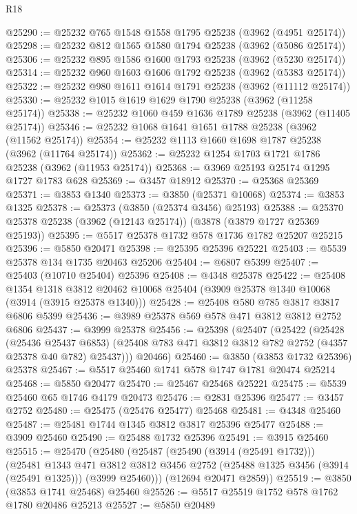 \begin{lexlean}{R18}
\begin{coremodule}
@25290 := @25232 @765 @1548 @1558 @1795 @25238 (@3962 (@4951 @25174))
@25298 := @25232 @812 @1565 @1580 @1794 @25238 (@3962 (@5086 @25174))
@25306 := @25232 @895 @1586 @1600 @1793 @25238 (@3962 (@5230 @25174))
@25314 := @25232 @960 @1603 @1606 @1792 @25238 (@3962 (@5383 @25174))
@25322 := @25232 @980 @1611 @1614 @1791 @25238 (@3962 (@11112 @25174))
@25330 := @25232 @1015 @1619 @1629 @1790 @25238 (@3962 (@11258 @25174))
@25338 := @25232 @1060 @459 @1636 @1789 @25238 (@3962 (@11405 @25174))
@25346 := @25232 @1068 @1641 @1651 @1788 @25238 (@3962 (@11562 @25174))
@25354 := @25232 @1113 @1660 @1698 @1787 @25238 (@3962 (@11764 @25174))
@25362 := @25232 @1254 @1703 @1721 @1786 @25238 (@3962 (@11953 @25174))
@25368 := @3969 @25193 @25174 @1295 @1727 @1783 @628
@25369 := @3457 @18912
@25370 := @25368 @25369
@25371 := @3853 @1340
@25373 := @3850 (@25371 @10068)
@25374 := @3853 @1325
@25378 := @25373 (@3850 (@25374 @3456) @25193)
@25388 := @25370 @25378 @25238 (@3962 (@12143 @25174)) (@3878 (@3879 @1727 @25369 @25193))
@25395 := @5517 @25378 @1732 @578 @1736 @1782 @25207 @25215
@25396 := @5850 @20471
@25398 := @25395 @25396 @25221
@25403 := @5539 @25378 @134 @1735 @20463 @25206
@25404 := @6807 @5399
@25407 := @25403 (@10710 @25404) @25396
@25408 := @4348 @25378
@25422 := @25408
    @1354
    @1318
    @3812
    @20462
    @10068
    @25404
    (@3909 @25378 @1340 @10068 (@3914 (@3915 @25378 @1340)))
@25428 := @25408 @580 @785 @3817 @3817 @6806 @5399
@25436 := @3989 @25378 @569 @578 @471 @3812 @3812 @2752 @6806
@25437 := @3999 @25378
@25456 := @25398
    (@25407
      (@25422
        (@25428
          (@25436 @25437 @6853)
          (@25408 @783 @471 @3812 @3812 @782 @2752 (@4357 @25378 @40 @782) @25437)))
      @20466)
@25460 := @3850 (@3853 @1732 @25396) @25378
@25467 := @5517 @25460 @1741 @578 @1747 @1781 @20474 @25214
@25468 := @5850 @20477
@25470 := @25467 @25468 @25221
@25475 := @5539 @25460 @65 @1746 @4179 @20473
@25476 := @2831 @25396
@25477 := @3457 @2752
@25480 := @25475 (@25476 @25477) @25468
@25481 := @4348 @25460
@25487 := @25481 @1744 @1345 @3812 @3817 @25396 @25477
@25488 := @3909 @25460
@25490 := @25488 @1732 @25396
@25491 := @3915 @25460
@25515 := @25470
    (@25480
      (@25487
        (@25490 (@3914 (@25491 @1732)))
        (@25481
          @1343
          @471
          @3812
          @3812
          @3456
          @2752
          (@25488 @1325 @3456 (@3914 (@25491 @1325)))
          (@3999 @25460)))
      (@12694 @20471 @2859))
@25519 := @3850 (@3853 @1741 @25468) @25460
@25526 := @5517 @25519 @1752 @578 @1762 @1780 @20486 @25213
@25527 := @5850 @20489

\end{coremodule}
\end{lexlean}
